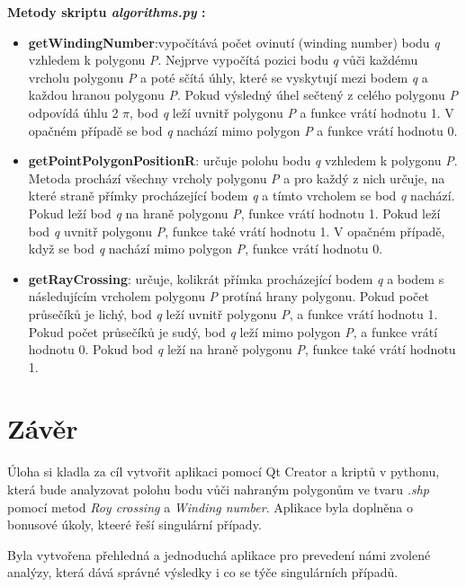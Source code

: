 \documentclass[a4paper,12pt]{article}
\begin{document}
    \textbf{Metody skriptu \emph{algorithms.py} :}
    \begin{itemize}
    \item \textbf{getWindingNumber}:vypočítává počet ovinutí (winding number) bodu \emph{q} vzhledem k polygonu \emph{P}. Nejprve vypočítá pozici bodu \emph{q} vůči každému vrcholu polygonu \emph{P} a poté sčítá úhly, které se vyskytují mezi bodem \emph{q} a každou hranou polygonu \emph{P}. Pokud výsledný úhel sečtený z celého polygonu \emph{P} odpovídá úhlu 2 $\pi$, bod \emph{q} leží uvnitř polygonu \emph{P} a funkce vrátí hodnotu 1. V opačném případě se bod \emph{q} nachází mimo polygon \emph{P} a funkce vrátí hodnotu 0.

    \item \textbf{getPointPolygonPositionR}: určuje polohu bodu \emph{q} vzhledem k polygonu \emph{P}. Metoda prochází všechny vrcholy polygonu \emph{P} a pro každý z nich určuje, na které straně přímky procházející bodem \emph{q} a tímto vrcholem se bod \emph{q} nachází. Pokud leží bod \emph{q} na hraně polygonu \emph{P}, funkce vrátí hodnotu 1. Pokud leží bod \emph{q} uvnitř polygonu \emph{P}, funkce také vrátí hodnotu 1. V opačném případě, když se bod \emph{q} nachází mimo polygon \emph{P}, funkce vrátí hodnotu 0.

    \item \textbf{getRayCrossing}: určuje, kolikrát přímka procházející bodem \emph{q} a bodem s následujícím vrcholem polygonu \emph{P} protíná hrany polygonu. Pokud počet průsečíků je lichý, bod \emph{q} leží uvnitř polygonu \emph{P}, a funkce vrátí hodnotu 1. Pokud počet průsečíků je sudý, bod \emph{q} leží mimo polygon \emph{P}, a funkce vrátí hodnotu 0. Pokud bod \emph{q} leží na hraně polygonu \emph{P}, funkce také vrátí hodnotu 1.
     
    \end{itemize}


    \newpage
    \section{Závěr}
     Úloha si kladla za cíl vytvořit aplikaci pomocí Qt Creator a kriptů v pythonu, která bude analyzovat polohu bodu vůči nahraným polygonům ve tvaru \emph{.shp} pomocí metod \emph{Roy crossing} a \emph{Winding number}. Aplikace byla doplněna o bonusové úkoly, kteeré řeší singulární případy.

     Byla vytvořena přehledná a jednoduchá aplikace pro prevedení námi zvolené analýzy, která dává správné výsledky i co se týče singulárních případů.
\end{document}

